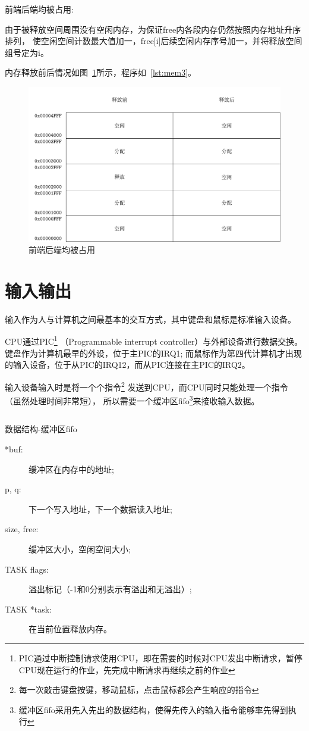 
前端后端均被占用:

由于被释放空间周围没有空闲内存，为保证free内各段内存仍然按照内存地址升序排列，
使空闲空间计数最大值加一，free[i]后续空闲内存序号加一，并将释放空间组号定为i。

内存释放前后情况如图~\ref{fig:mem3}所示，程序如~\ref{lst:mem3}。
\begin{figure}[h]
  \centering
  \includegraphics[width=.7\textwidth]{fig/mem3.pdf}
  \caption{前端后端均被占用}
  \label{fig:mem3}
\end{figure}

\section{输入输出}

输入作为人与计算机之间最基本的交互方式，其中键盘和鼠标是标准输入设备。

CPU通过PIC\footnote{PIC通过中断控制请求使用CPU，即在需要的时候对CPU发出中断请求，暂停CPU现在运行的作业，先完成中断请求再继续之前的作业}
（Programmable interrupt controller）与外部设备进行数据交换。
键盘作为计算机最早的外设，位于主PIC的IRQ1;
而鼠标作为第四代计算机才出现的输入设备，位于从PIC的IRQ12，而从PIC连接在主PIC的IRQ2。

输入设备输入时是将一个个指令\footnote{每一次敲击键盘按键，移动鼠标，点击鼠标都会产生响应的指令}
发送到CPU，而CPU同时只能处理一个指令（虽然处理时间非常短），
所以需要一个缓冲区fifo\footnote{缓冲区fifo采用先入先出的数据结构，使得先传入的输入指令能够率先得到执行}来接收输入数据。

\begin{listing}[H]
  \inputminted[tabsize=2, firstline=40, lastline=44,
    linenos=true]{c}{../ZOS/src/kernel/bootpack.h}
  \caption{数据结构-缓冲区fifo}
  \label{lst:fifo}
\end{listing}
\begin{description}
\item[*buf:]缓冲区在内存中的地址;
\item[p, q:]下一个写入地址，下一个数据读入地址;
\item[size, free:]缓冲区大小，空闲空间大小;
\item[TASK flags:]溢出标记（-1和0分别表示有溢出和无溢出）;
\item[TASK *task:]在当前位置释放内存。
\end{description}

